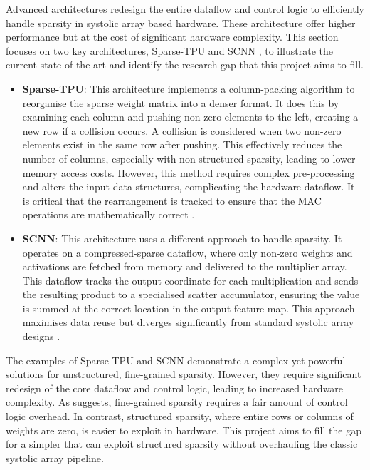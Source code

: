 \documentclass[12pt, a4paper, ukenglish]{article}
\begin{document}
        Advanced architectures redesign the entire dataflow and control logic to efficiently handle sparsity in systolic array based hardware. These architecture offer higher performance but at the cost of significant hardware complexity. This section focuses on two key architectures, Sparse-TPU \cite{he_sparse-tpu_2020} and SCNN \cite{parashar_scnn_2017}, to illustrate the current state-of-the-art and identify the research gap that this project aims to fill. 

        \begin{itemize}
            \item \textbf{Sparse-TPU}: This architecture implements a column-packing algorithm to reorganise the sparse weight matrix into a denser format. It does this by examining each column and pushing non-zero elements to the left, creating a new row if a collision occurs. A collision is considered when two non-zero elements exist in the same row after pushing. This effectively reduces the number of columns, especially with non-structured sparsity, leading to lower memory access costs. However, this method requires complex pre-processing and alters the input data structures, complicating the hardware dataflow. It is critical that the rearrangement is tracked to ensure that the MAC operations are mathematically correct \cite{he_sparse-tpu_2020}. 
            \item \textbf{SCNN}: This architecture uses a different approach to handle sparsity. It operates on a compressed-sparse dataflow, where only non-zero weights and activations are fetched from memory and delivered to the multiplier array. This dataflow tracks the output coordinate for each multiplication and sends the resulting product to a specialised scatter accumulator, ensuring the value is summed at the correct location in the output feature map. This approach maximises data reuse but diverges significantly from standard systolic array designs \cite{parashar_scnn_2017}.
        \end{itemize}
    
        The examples of Sparse-TPU and SCNN demonstrate a complex yet powerful solutions for unstructured, fine-grained sparsity. However, they require significant redesign of the core dataflow and control logic, leading to increased hardware complexity. As \textcite{palacios_systolic_2025} suggests, fine-grained sparsity requires a fair amount of control logic overhead. In contrast, structured sparsity, where entire rows or columns of weights are zero, is easier to exploit in hardware. This project aims to fill the gap for a simpler that can exploit structured sparsity without overhauling the classic systolic array pipeline.
\end{document}
